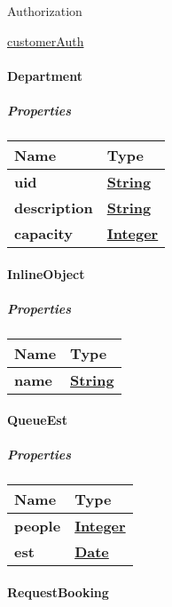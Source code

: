 Authorization

\href{../README.md\#customerAuth}{customerAuth}

\hypertarget{department}{%
\paragraph{Department}\label{department}}

\hypertarget{properties}{%
\subparagraph{Properties}\label{properties}}

\begin{longtable}[]{@{}ll@{}}
\toprule
Name & Type\tabularnewline
\midrule
\endhead
\textbf{uid} & \href{string.md}{\textbf{String}}\tabularnewline
\textbf{description} & \href{string.md}{\textbf{String}}\tabularnewline
\textbf{capacity} & \href{integer.md}{\textbf{Integer}}\tabularnewline
\bottomrule
\end{longtable}

\hypertarget{inlineobject}{%
\paragraph{InlineObject}\label{inlineobject}}

\hypertarget{properties-1}{%
\subparagraph{Properties}\label{properties-1}}

\begin{longtable}[]{@{}ll@{}}
\toprule
Name & Type\tabularnewline
\midrule
\endhead
\textbf{name} & \href{string.md}{\textbf{String}}\tabularnewline
\bottomrule
\end{longtable}

\hypertarget{queueest}{%
\paragraph{QueueEst}\label{queueest}}

\hypertarget{properties-2}{%
\subparagraph{Properties}\label{properties-2}}

\begin{longtable}[]{@{}ll@{}}
\toprule
Name & Type\tabularnewline
\midrule
\endhead
\textbf{people} & \href{integer.md}{\textbf{Integer}}\tabularnewline
\textbf{est} & \href{DateTime.md}{\textbf{Date}}\tabularnewline
\bottomrule
\end{longtable}

\hypertarget{requestbooking}{%
\paragraph{RequestBooking}\label{requestbooking}}

